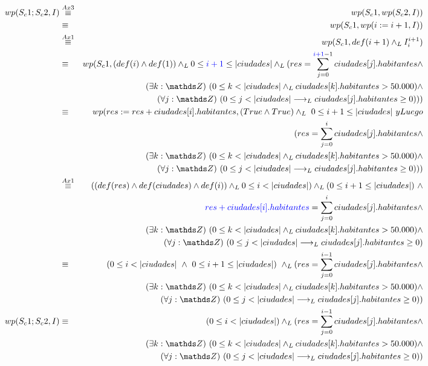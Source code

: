 \documentclass[10pt,a4paper,fleqn]{article}
\begin{document}
\begin{eqnarray}
    wp(S_c1;S_c2, I) &\overset{Ax3}{\equiv}& wp(S_c1, wp(S_c2, I)) \notag \\
     &\equiv&  wp(S_c1, wp(i:= i+1, I))\notag \\
      &\overset{Ax1}{\equiv}& wp(S_c1,def(i+1) \yLuego I_{i}^{i+1})\notag \\
      &\equiv&  wp(S_c1, (def(i) \land def(1)) \yLuego 0 \leq \textcolor{blue}{i+1} \leq |ciudades| \yLuego (res = \small \displaystyle \sum_{j=0}^{\textcolor{blue}{i+1}-1} ciudades[j].habitantes \land \notag \\ & & \existe[unalinea]{k}{\ent}{0 \leq k< |ciudades| \yLuego ciudades[k].habitantes >  50.000 }\land \notag \\ & & \paraTodo[unalinea]{j}{\ent}{0\leq j < |ciudades| \implicaLuego ciudades[j].habitantes \geq 0})) \notag \\
       &\equiv& wp(res:= res + ciudades[i].habitantes, (True \land True) \yLuego \ 0 \leq i+1 \leq |ciudades| \ yLuego \notag \\ & & (res = \small \displaystyle \sum_{j=0}^{i} ciudades[j].habitantes \land \notag \\ & & \existe[unalinea]{k}{\ent}{0 \leq k< |ciudades| \yLuego ciudades[k].habitantes >  50.000 }\land \notag \\ & & \paraTodo[unalinea]{j}{\ent}{0\leq j < |ciudades| \implicaLuego ciudades[j].habitantes \geq 0})) \notag \\
       &\overset{Ax1}{\equiv}& ((def(res) \land def(ciudades) \land def(i))\yLuego 0 \leq i < |ciudades|) \yLuego (0 \leq i+1 \leq |ciudades|) \ \land \notag  \\ & & \textcolor{blue}{res + ciudades[i].habitantes} = \small \displaystyle \sum_{j=0}^{i} ciudades[j].habitantes \land \\ & & \existe[unalinea]{k}{\ent}{0 \leq k< |ciudades| \yLuego ciudades[k].habitantes >  50.000 }\land \notag \\ & & \paraTodo[unalinea]{j}{\ent}{0\leq j < |ciudades| \implicaLuego ciudades[j].habitantes \geq 0} \notag \\
        &\equiv& (0 \leq i < |ciudades| \ \land \ 0 \leq i+1 \leq |ciudades|) \ \yLuego (res= \small \displaystyle \sum_{j=0}^{i-1} ciudades[j].habitantes \land \\ & & \existe[unalinea]{k}{\ent}{0 \leq k< |ciudades| \yLuego ciudades[k].habitantes >  50.000 }\land \notag \\ & & \paraTodo[unalinea]{j}{\ent}{0\leq j < |ciudades| \implicaLuego ciudades[j].habitantes \geq 0}) \notag \\
        wp(S_c1;S_c2, I)  &\equiv& (0 \leq i <|ciudades|) \yLuego (res= \small \displaystyle \sum_{j=0}^{i-1} ciudades[j].habitantes \land \notag \\ & & \existe[unalinea]{k}{\ent}{0 \leq k< |ciudades| \yLuego ciudades[k].habitantes >  50.000 }\land \notag \\ & & \paraTodo[unalinea]{j}{\ent}{0\leq j < |ciudades| \implicaLuego ciudades[j].habitantes \geq 0}) \notag 
\end{eqnarray}
\end{document}
